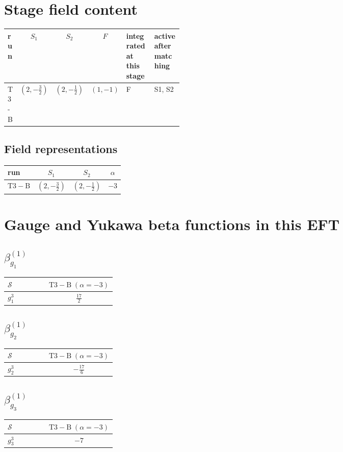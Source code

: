 \documentclass[9pt]{article}
\begin{document}
\section*{Stage field content}
\begin{longtable}{@{}lccc p{0.20\linewidth}p{0.20\linewidth}@{}}
\toprule
run & $S_1$ & $S_2$ & $F$ & integrated at this stage & active after matching \\
\midrule
T3-B & $(2,- \frac{3}{2})$ & $(2,- \frac{1}{2})$ & $(1,-1)$ & F & S1, S2 \\
\bottomrule
\end{longtable}
\subsection*{Field representations}
\begin{longtable}{@{}lccc@{}}
\toprule
run & $S_1$ & $S_2$ & $\alpha$ \\
\midrule
$\mathrm{T3-B}$ & $(2,- \frac{3}{2})$ & $(2,- \frac{1}{2})$ & $-3$ \\
\bottomrule
\end{longtable}
\section*{Gauge and Yukawa beta functions in this EFT}
\subsection*{$ \beta_{g_1}^{(1)} $}
\begin{longtable}{@{}p{0.38\linewidth}c@{}}
\toprule
$\mathcal{S}$ & $ \mathrm{T3-B}\;(\alpha=-3) $ \\
\midrule
$ g_1^3 $ & $ \frac{17}{2} $ \\
\bottomrule
\end{longtable}
\subsection*{$ \beta_{g_2}^{(1)} $}
\begin{longtable}{@{}p{0.38\linewidth}c@{}}
\toprule
$\mathcal{S}$ & $ \mathrm{T3-B}\;(\alpha=-3) $ \\
\midrule
$ g_2^3 $ & $ - \frac{17}{6} $ \\
\bottomrule
\end{longtable}
\subsection*{$ \beta_{g_3}^{(1)} $}
\begin{longtable}{@{}p{0.38\linewidth}c@{}}
\toprule
$\mathcal{S}$ & $ \mathrm{T3-B}\;(\alpha=-3) $ \\
\midrule
$ g_3^3 $ & $ -7 $ \\
\bottomrule
\end{longtable}
\end{document}

